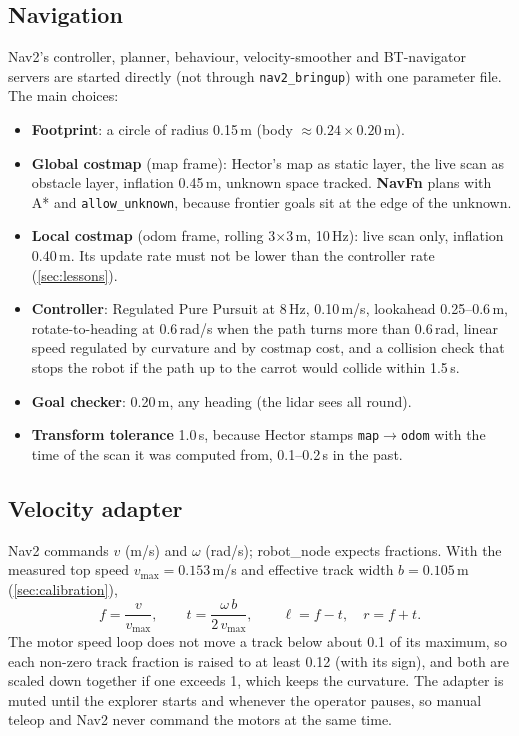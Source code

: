 \documentclass[10pt,twocolumn]{article}
\begin{document}
\subsection{Navigation}
Nav2's controller, planner, behaviour, velocity-smoother and BT-navigator servers are started
directly (not through \texttt{nav2\_bringup}) with one parameter file. The main choices:
\begin{itemize}
\item \textbf{Footprint}: a circle of radius 0.15\,m (body $\approx0.24\times0.20$\,m).
\item \textbf{Global costmap} (map frame): Hector's map as static layer, the live scan as obstacle
  layer, inflation 0.45\,m, unknown space tracked. \textbf{NavFn} plans with A* and
  \texttt{allow\_unknown}, because frontier goals sit at the edge of the unknown.
\item \textbf{Local costmap} (odom frame, rolling 3$\times$3\,m, 10\,Hz): live scan only, inflation
  0.40\,m. Its update rate must not be lower than the controller rate (\cref{sec:lessons}).
\item \textbf{Controller}: Regulated Pure Pursuit at 8\,Hz, 0.10\,m/s, lookahead 0.25--0.6\,m,
  rotate-to-heading at 0.6\,rad/s when the path turns more than 0.6\,rad, linear speed
  regulated by curvature and by costmap cost, and a collision check that stops the robot if the
  path up to the carrot would collide within 1.5\,s.
\item \textbf{Goal checker}: 0.20\,m, any heading (the lidar sees all round).
\item \textbf{Transform tolerance} 1.0\,s, because Hector stamps \texttt{map}$\to$\texttt{odom}
  with the time of the scan it was computed from, 0.1--0.2\,s in the past.
\end{itemize}

\subsection{Velocity adapter}
Nav2 commands $v$ (m/s) and $\omega$ (rad/s); robot\_node expects fractions. With the measured
top speed $v_{\max}=0.153$\,m/s and effective track width $b=0.105$\,m (\cref{sec:calibration}),
\begin{equation}
f = \frac{v}{v_{\max}},\qquad t = \frac{\omega\, b}{2\,v_{\max}},\qquad
\ell = f - t,\quad r = f + t .
\end{equation}
The motor speed loop does not move a track below about 0.1 of its maximum, so each non-zero
track fraction is raised to at least 0.12 (with its sign), and both are scaled down together if
one exceeds 1, which keeps the curvature. The adapter is muted until the explorer starts and
whenever the operator pauses, so manual teleop and Nav2 never command the motors at the same time.
\end{document}
